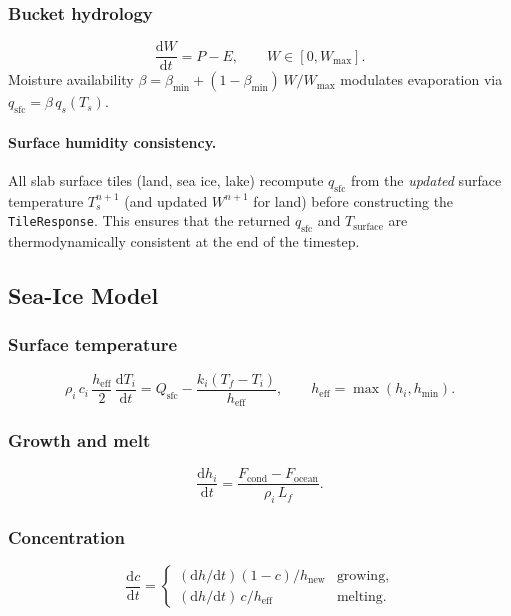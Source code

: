\documentclass[11pt,a4paper]{article}
\newcommand{\dd}{\mathrm{d}}
\begin{document}
\subsubsection{Bucket hydrology}
\begin{equation}
  \frac{\dd W}{\dd t} = P - E, \qquad W\in[0,W_{\max}].
\end{equation}
Moisture availability $\beta=\beta_{\min}+(1-\beta_{\min})\,W/W_{\max}$ modulates evaporation via $q_{\mathrm{sfc}}=\beta\,q_s(T_s)$.

\paragraph{Surface humidity consistency.}
All slab surface tiles (land, sea ice, lake) recompute $q_{\mathrm{sfc}}$ from the \emph{updated} surface temperature $T_s^{n+1}$ (and updated $W^{n+1}$ for land) before constructing the \texttt{TileResponse}.  This ensures that the returned $q_{\mathrm{sfc}}$ and $T_{\mathrm{surface}}$ are thermodynamically consistent at the end of the timestep.

\subsection{Sea-Ice Model}

\subsubsection{Surface temperature}
\begin{equation}
  \rho_i\,c_i\,\frac{h_{\mathrm{eff}}}{2}\,\frac{\dd T_i}{\dd t} = Q_{\mathrm{sfc}} - \frac{k_i(T_f-T_i)}{h_{\mathrm{eff}}},
  \qquad h_{\mathrm{eff}}=\max(h_i,h_{\min}).
\end{equation}

\subsubsection{Growth and melt}
\begin{equation}
  \frac{\dd h_i}{\dd t} = \frac{F_{\mathrm{cond}}-F_{\mathrm{ocean}}}{\rho_i\,L_f}.
\end{equation}

\subsubsection{Concentration}
\begin{equation}
  \frac{\dd c}{\dd t} = \begin{cases}
    (\dd h/\dd t)(1-c)/h_{\mathrm{new}} & \text{growing},\\
    (\dd h/\dd t)\,c/h_{\mathrm{eff}} & \text{melting}.
  \end{cases}
\end{equation}
\end{document}
